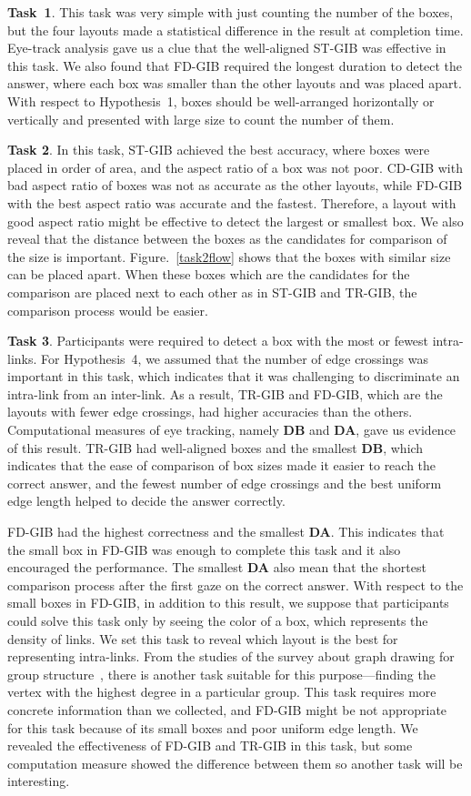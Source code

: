 \documentclass[review]{vgtc}                 %
\begin{document}
{\bf Task~1}. This task was very simple with just counting the number of the boxes, but the four layouts made a statistical difference in the result at completion time.
Eye-track analysis gave us a clue that the well-aligned ST-GIB was effective in this task.
We also found that FD-GIB required the longest duration to detect the answer, where each box was smaller than the other layouts and was placed apart.
With respect to Hypothesis~1, boxes should be well-arranged horizontally or vertically and presented with large size to count the number of them.

{\bf Task 2}. In this task, ST-GIB achieved the best accuracy, where boxes were placed in order of area, and the aspect ratio of a box was not poor.
CD-GIB with bad aspect ratio of boxes was not as accurate as the other layouts, while FD-GIB with the best aspect ratio was accurate and the fastest.
Therefore, a layout with good aspect ratio might be effective to detect the largest or smallest box.
We also reveal that the distance between the boxes as the candidates for comparison of the size is important.
Figure.~\ref{task2flow} shows that the boxes with similar size can be placed apart.
When these boxes which are the candidates for the comparison are placed next to each other as in ST-GIB and TR-GIB, the comparison process would be easier.

{\bf Task 3}. Participants were required to detect a box with the most or fewest intra-links.
For Hypothesis~4, we assumed that the number of edge crossings was important in this task, which indicates that it was challenging to discriminate an intra-link from an inter-link.
As a result, TR-GIB and FD-GIB, which are the layouts with fewer edge crossings, had higher accuracies than the others.
Computational measures of eye tracking, namely {\bf DB} and {\bf DA}, gave us evidence of this result.
TR-GIB had well-aligned boxes and the smallest {\bf DB}, which indicates that the ease of comparison of box sizes made it easier to reach the correct answer, and the fewest number of edge crossings and the best uniform edge length helped to decide the answer correctly.

FD-GIB had the highest correctness and the smallest {\bf DA}.
This indicates that the small box in FD-GIB was enough to complete this task and it also encouraged the performance.
The smallest {\bf DA} also mean that the shortest comparison process after the first gaze on the correct answer.
With respect to the small boxes in FD-GIB, in addition to this result, we suppose that participants could solve this task only by seeing the color of a box, which represents the density of links.
We set this task to reveal which layout is the best for representing intra-links.
From the studies of the survey about graph drawing for group structure~\cite{Vehlow2017VisualizingGS,saket2014group}, there is another task suitable for this purpose---finding the vertex with the highest degree in a particular group.
This task requires more concrete information than we collected, and FD-GIB might be not appropriate for this task because of its small boxes and poor uniform edge length.
We revealed the effectiveness of FD-GIB and TR-GIB in this task, but some computation measure showed the difference between them so another task will be interesting.
\end{document}

